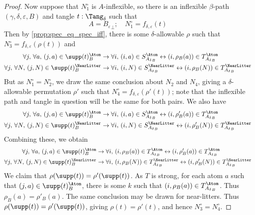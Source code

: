 \begin{proof}
  Now suppose that \( N_1^\circ \) is \( A \)-inflexible, so there is an inflexible \( \beta \)-path \( (\gamma,\delta,\varepsilon,B) \) and tangle \( t : \Tang_\delta \) such that
  \[ A = {B_\varepsilon}_\bot;\quad N_1^\circ = f_{\delta,\varepsilon}(t) \]
  Then by \cref{prop:spec_eq_spec_iff}, there is some \( \delta \)-allowable \( \rho \) such that \( N_3^\circ = f_{\delta,\varepsilon}(\rho(t)) \) and
  \begin{align*}
    \forall j,\, \forall a,\, (j, a) \in \supp(t)_B^\Atom &\to \forall i,\, (i, a) \in S_{{A_\delta}_B}^\Atom \leftrightarrow (i, \rho_B(a)) \in T_{{A_\delta}_B}^\Atom \\
    \forall j,\, \forall N,\, (j, N) \in \supp(t)_B^\NearLitter &\to \forall i,\, (i, N) \in S_{{A_\delta}_B}^\NearLitter \leftrightarrow (i, \rho_B(N)) \in T_{{A_\delta}_B}^\NearLitter
  \end{align*}
  But as \( N_1^\circ = N_2^\circ \), we draw the same conclusion about \( N_2 \) and \( N_4 \), giving a \( \delta \)-allowable permutation \( \rho' \) such that \( N_4^\circ = f_{\delta,\varepsilon}(\rho'(t)) \); note that the inflexible path and tangle in question will be the same for both pairs.
  We also have
  \begin{align*}
    \forall j,\, \forall a,\, (j, a) \in \supp(t)_B^\Atom &\to \forall i,\, (i, a) \in S_{{A_\delta}_B}^\Atom \leftrightarrow (i, \rho'_B(a)) \in T_{{A_\delta}_B}^\Atom \\
    \forall j,\, \forall N,\, (j, N) \in \supp(t)_B^\NearLitter &\to \forall i,\, (i, N) \in S_{{A_\delta}_B}^\NearLitter \leftrightarrow (i, \rho'_B(N)) \in T_{{A_\delta}_B}^\NearLitter
  \end{align*}
  Combining these, we obtain
  \begin{align*}
    \forall j,\, \forall a,\, (j, a) \in \supp(t)_B^\Atom &\to \forall i,\, (i, \rho_B(a)) \in T_{{A_\delta}_B}^\Atom \leftrightarrow (i, \rho'_B(a)) \in T_{{A_\delta}_B}^\Atom \\
    \forall j,\, \forall N,\, (j, N) \in \supp(t)_B^\NearLitter &\to \forall i,\, (i, \rho_B(N)) \in T_{{A_\delta}_B}^\NearLitter \leftrightarrow (i, \rho'_B(N)) \in T_{{A_\delta}_B}^\NearLitter
  \end{align*}
  We claim that \( \rho(\supp(t)) = \rho'(\supp(t)) \).
  As \( T \) is strong, for each atom \( a \) such that \( (j, a) \in \supp(t)_B^\Atom \), there is some \( k \) such that \( (i, \rho_B(a)) \in T_{{A_\delta}_B}^\Atom \).
  Thus \( \rho_B(a) = \rho'_B(a) \).
  The same conclusion may be drawn for near-litters.
  Thus \( \rho(\supp(t)) = \rho'(\supp(t)) \), giving \( \rho(t) = \rho'(t) \), and hence \( N_3^\circ = N_4^\circ \).
\end{proof}
